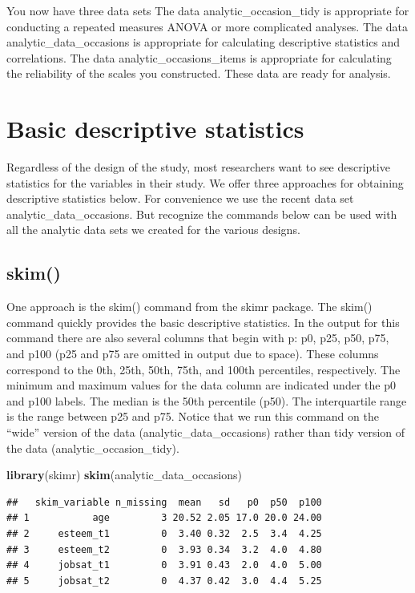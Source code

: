 \documentclass[
]{krantz}
\makeatletter
\newenvironment{Shaded}{\begin{snugshade}}{\end{snugshade}}
\newcommand{\KeywordTok}[1]{\textcolor[rgb]{0.27,0.27,0.27}{\textbf{#1}}}
\newcommand{\NormalTok}[1]{#1}
\newenvironment{kframe}{%
\medskip{}
\setlength{\fboxsep}{.8em}
 \def\at@end@of@kframe{}%
 \ifinner\ifhmode%
  \def\at@end@of@kframe{\end{minipage}}%
  \begin{minipage}{\columnwidth}%
 \fi\fi%
 \def\FrameCommand##1{\hskip\@totalleftmargin \hskip-\fboxsep
 \colorbox{shadecolor}{##1}\hskip-\fboxsep
     \hskip-\linewidth \hskip-\@totalleftmargin \hskip\columnwidth}%
 \MakeFramed {\advance\hsize-\width
   \@totalleftmargin\z@ \linewidth\hsize
   \@setminipage}}%
 {\par\unskip\endMakeFramed%
 \at@end@of@kframe}
\renewenvironment{Shaded}{\begin{kframe}}{\end{kframe}}
\makeatother
\begin{document}
You now have three data sets The data analytic\_occasion\_tidy is appropriate for conducting a repeated measures ANOVA or more complicated analyses. The data analytic\_data\_occasions is appropriate for calculating descriptive statistics and correlations. The data analytic\_occasions\_items is appropriate for calculating the reliability of the scales you constructed. These data are ready for analysis.

\hypertarget{basic-descriptive-statistics}{%
\section{Basic descriptive statistics}\label{basic-descriptive-statistics}}

Regardless of the design of the study, most researchers want to see descriptive statistics for the variables in their study. We offer three approaches for obtaining descriptive statistics below. For convenience we use the recent data set analytic\_data\_occasions. But recognize the commands below can be used with all the analytic data sets we created for the various designs.

\hypertarget{skim}{%
\subsection{skim()}\label{skim}}

One approach is the skim() command from the skimr package. The skim() command quickly provides the basic descriptive statistics. In the output for this command there are also several columns that begin with p: p0, p25, p50, p75, and p100 (p25 and p75 are omitted in output due to space). These columns correspond to the 0th, 25th, 50th, 75th, and 100th percentiles, respectively. The minimum and maximum values for the data column are indicated under the p0 and p100 labels. The median is the 50th percentile (p50). The interquartile range is the range between p25 and p75. Notice that we run this command on the ``wide'' version of the data (analytic\_data\_occasions) rather than tidy version of the data (analytic\_occasion\_tidy).

\begin{Shaded}
\begin{Highlighting}[]
\KeywordTok{library}\NormalTok{(skimr)}
\KeywordTok{skim}\NormalTok{(analytic_data_occasions)}
\end{Highlighting}
\end{Shaded}

\begin{verbatim}
##   skim_variable n_missing  mean   sd   p0  p50  p100
## 1           age         3 20.52 2.05 17.0 20.0 24.00
## 2     esteem_t1         0  3.40 0.32  2.5  3.4  4.25
## 3     esteem_t2         0  3.93 0.34  3.2  4.0  4.80
## 4     jobsat_t1         0  3.91 0.43  2.0  4.0  5.00
## 5     jobsat_t2         0  4.37 0.42  3.0  4.4  5.25
\end{verbatim}
\end{document}
